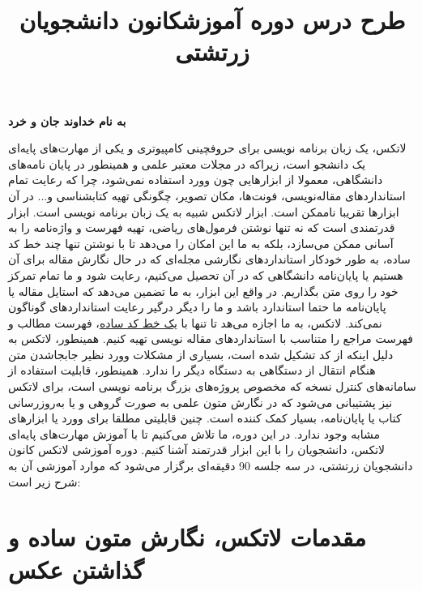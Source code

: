\documentclass{article}
\begin{document}
\textbf{به نام خداوند جان و خرد}
\begin{flushright}
\vspace{5mm}
\title*{\textbf{\fontsize{31pt}{36pt}\selectfont \textcolor{BrickRed}{طرح درس دوره آموزش}}}
\end{flushright}
\title*{\textbf{\fontsize{180pt}{36pt}\selectfont \textcolor{BrickRed}{\lr{\LaTeX}}}}
\begin{flushleft}
\title*{\textbf{\fontsize{31pt}{36pt}\selectfont \textcolor{BrickRed}{کانون دانشجویان زرتشتی}}}
\end{flushleft}
\vspace{5mm}

لاتکس، یک زبان برنامه نویسی برای حروفچینی کامپیوتری و یکی از مهارت‌های پایه‌ای یک دانشجو است، زیراکه در مجلات معتبر علمی و همینطور در پایان نامه‌های دانشگاهی، معمولا از ابزارهایی چون وورد استفاده نمی‌شود، چرا که رعایت تمام استاندارد‌های مقاله‌نویسی، فونت‌‌‌‌‌‌‌‌‌‌‌‌‌‌‌‌‌‌‌‌‌ها، مکان تصویر، چگونگی تهیه کتابشناسی و... در آن ابزارها تقریبا ناممکن است. ابزار لاتکس شبیه به یک زبان برنامه نویسی است. ابزار قدرتمندی است که نه تنها نوشتن فرمول‌های ریاضی، تهیه فهرست و واژه‌نامه را به آسانی ممکن می‌سازد، بلکه به ما این امکان را می‌دهد تا با نوشتن تنها چند خط کد ساده، به طور خودکار استانداردهای نگارشی مجله‌ای که در حال نگارش مقاله برای آن هستیم یا پایان‌نامه دانشگاهی که در آن تحصیل می‌کنیم، رعایت شود و ما تمام تمرکز خود را روی متن بگذاریم. در واقع این ابزار، به ما تضمین می‌دهد که استایل مقاله یا پایان‌نامه ما حتما استاندارد باشد و ما را دیگر درگیر رعایت استانداردهای گوناگون نمی‌کند. لاتکس، به ما اجازه می‌هد تا تنها با \underline{یک خط کد ساده}، فهرست مطالب و فهرست مراجع را متناسب با استانداردهای مقاله نویسی تهیه کنیم. همینطور، لاتکس به دلیل اینکه از کد تشکیل شده است، بسیاری از مشکلات وورد نظیر جابجاشدن متن هنگام انتقال از دستگاهی به دستگاه دیگر را ندارد. همینطور، قابلیت استفاده از سامانه‌های کنترل نسخه که مخصوص پروژه‌های بزرگ برنامه نویسی است، برای لاتکس نیز پشتیبانی می‌شود که در نگارش متون علمی به صورت گروهی و یا به‌روزرسانی کتاب یا پایان‌نامه، بسیار کمک کننده است. چنین قابلیتی مطلقا برای وورد یا ابزارهای مشابه وجود ندارد. در این دوره، ما تلاش می‌کنیم تا با آموزش مهارت‌های پایه‌ای لاتکس، دانشجویان را با این ابزار قدرتمند آشنا کنیم.
\newpage
دوره آموزشی لاتکس کانون دانشجویان زرتشتی، در سه جلسه 90 دقیقه‌ای برگزار می‌شود که موارد آموزشی آن به شرح زیر است:




\section{مقدمات لاتکس، نگارش متون ساده و گذاشتن عکس}
\end{document}
